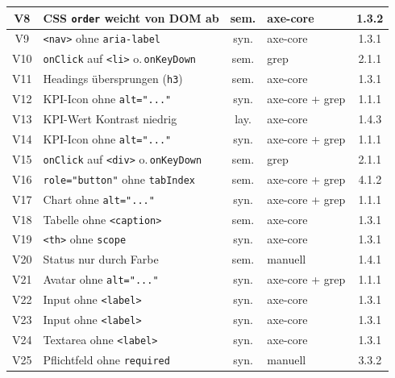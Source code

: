 \begin{longtable}{|c|p{5.8cm}|c|p{3.6cm}|c|}
V8   & \ac{CSS} \texttt{order} weicht von \ac{DOM} ab      & sem. & axe-core                & 1.3.2 \\ \hline
V9   & \texttt{<nav>} ohne \texttt{aria-label}   & syn. & axe-core                & 1.3.1 \\ \hline
V10  & \texttt{onClick} auf \texttt{<li>} o.\,\texttt{onKeyDown} & sem. & grep & 2.1.1 \\ \hline
V11  & Headings übersprungen (\texttt{h3})       & sem. & axe-core                & 1.3.1 \\ \hline
V12  & \ac{KPI}-Icon ohne \texttt{alt="..."}                & syn. & axe-core + grep         & 1.1.1 \\ \hline
V13  & \ac{KPI}-Wert Kontrast niedrig                 & lay. & axe-core                & 1.4.3 \\ \hline
V14  & \ac{KPI}-Icon ohne \texttt{alt="..."}                & syn. & axe-core + grep         & 1.1.1 \\ \hline
V15  & \texttt{onClick} auf \texttt{<div>} o.\,\texttt{onKeyDown} & sem. & grep & 2.1.1 \\ \hline
V16  & \texttt{role="button"} ohne \texttt{tabIndex} & sem. & axe-core + grep    & 4.1.2 \\ \hline
V17  & Chart ohne \texttt{alt="..."}                   & syn. & axe-core + grep         & 1.1.1 \\ \hline
V18  & Tabelle ohne \texttt{<caption>}           & sem. & axe-core                & 1.3.1 \\ \hline
V19  & \texttt{<th>} ohne \texttt{scope}         & syn. & axe-core                & 1.3.1 \\ \hline
V20  & Status nur durch Farbe                    & sem. & manuell                 & 1.4.1 \\ \hline
V21  & Avatar ohne \texttt{alt="..."}                  & syn. & axe-core + grep         & 1.1.1 \\ \hline
V22  & Input ohne \texttt{<label>}               & syn. & axe-core                & 1.3.1 \\ \hline
V23  & Input ohne \texttt{<label>}               & syn. & axe-core                & 1.3.1 \\ \hline
V24  & Textarea ohne \texttt{<label>}            & syn. & axe-core                & 1.3.1 \\ \hline
V25  & Pflichtfeld ohne \texttt{required}        & syn. & manuell                 & 3.3.2 \\ \hline

\end{longtable}
